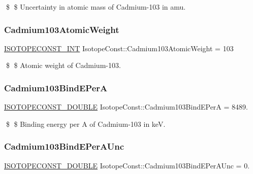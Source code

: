 \$ \$ Uncertainty in atomic mass of Cadmium-\/103 in amu. \mbox{\label{group___isotope_const-_cadmium-_cd103_ga15a33ca2528d45ac76e48c01b7a516ed}} 
\subsubsection{\texorpdfstring{Cadmium103\+Atomic\+Weight}{Cadmium103AtomicWeight}}
{\footnotesize\ttfamily \mbox{\hyperlink{group___isotope_const-_macros_ga5f18360b3e99483a35c32d789e62621c}{I\+S\+O\+T\+O\+P\+E\+C\+O\+N\+S\+T\+\_\+\+I\+NT}} Isotope\+Const\+::\+Cadmium103\+Atomic\+Weight = 103}

\$ \$ Atomic weight of Cadmium-\/103. \mbox{\label{group___isotope_const-_cadmium-_cd103_gad90648168a4f0763f7ff029814fdba77}} 
\subsubsection{\texorpdfstring{Cadmium103\+Bind\+E\+PerA}{Cadmium103BindEPerA}}
{\footnotesize\ttfamily \mbox{\hyperlink{group___isotope_const-_macros_ga8f45a7272ce02c0b4c65c44636ed719a}{I\+S\+O\+T\+O\+P\+E\+C\+O\+N\+S\+T\+\_\+\+D\+O\+U\+B\+LE}} Isotope\+Const\+::\+Cadmium103\+Bind\+E\+PerA = 8489.}

\$ \$ Binding energy per A of Cadmium-\/103 in keV. \mbox{\label{group___isotope_const-_cadmium-_cd103_gad808dc6f085a902cbc1bd084dabe744f}} 
\subsubsection{\texorpdfstring{Cadmium103\+Bind\+E\+Per\+A\+Unc}{Cadmium103BindEPerAUnc}}
{\footnotesize\ttfamily \mbox{\hyperlink{group___isotope_const-_macros_ga8f45a7272ce02c0b4c65c44636ed719a}{I\+S\+O\+T\+O\+P\+E\+C\+O\+N\+S\+T\+\_\+\+D\+O\+U\+B\+LE}} Isotope\+Const\+::\+Cadmium103\+Bind\+E\+Per\+A\+Unc = 0.}

